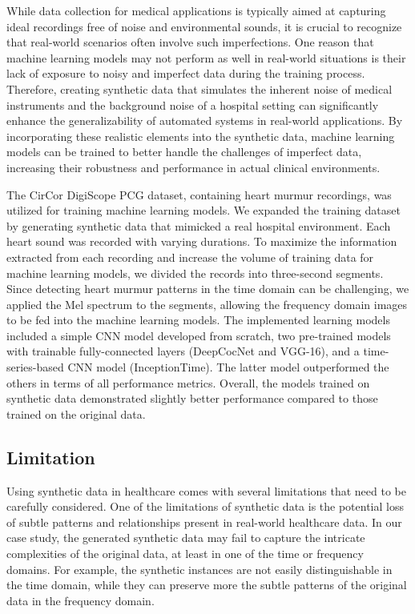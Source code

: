 \documentclass{article}
\begin{document}
\par While data collection for medical applications is typically aimed at capturing ideal recordings free of noise and environmental sounds, it is crucial to recognize that real-world scenarios often involve such imperfections.  One reason that machine learning models may not perform as well in real-world situations is their lack of exposure to noisy and imperfect data during the training process. Therefore, creating synthetic data that simulates the inherent noise of medical instruments and the background noise of a hospital setting can significantly enhance the generalizability of automated systems in real-world applications. By incorporating these realistic elements into the synthetic data, machine learning models can be trained to better handle the challenges of imperfect data, increasing their robustness and performance in actual clinical environments. 

\par The CirCor DigiScope PCG dataset, containing heart murmur recordings, was utilized for training machine learning models. We expanded the training dataset by generating synthetic data that mimicked a real hospital environment. Each heart sound was recorded with varying durations. To maximize the information extracted from each recording and increase the volume of training data for machine learning models, we divided the records into three-second segments. Since detecting heart murmur patterns in the time domain can be challenging, we applied the Mel spectrum to the segments, allowing the frequency domain images to be fed into the machine learning models. The implemented learning models included a simple CNN model developed from scratch, two pre-trained models with trainable fully-connected layers (DeepCocNet and VGG-16), and a time-series-based CNN model (InceptionTime). The latter model outperformed the others in terms of all performance metrics. Overall, the models trained on synthetic data demonstrated slightly better performance compared to those trained on the original data.

\subsection{Limitation}
Using synthetic data in healthcare comes with several limitations that need to be carefully considered. One of the limitations of synthetic data is the potential loss of subtle patterns and relationships present in real-world healthcare data. In our case study, the generated synthetic data may fail to capture the intricate complexities of the original data, at least in one of the time or frequency domains. For example, the synthetic instances are not easily distinguishable in the time domain, while they can preserve more the subtle patterns of the original data in the frequency domain.
\end{document}
